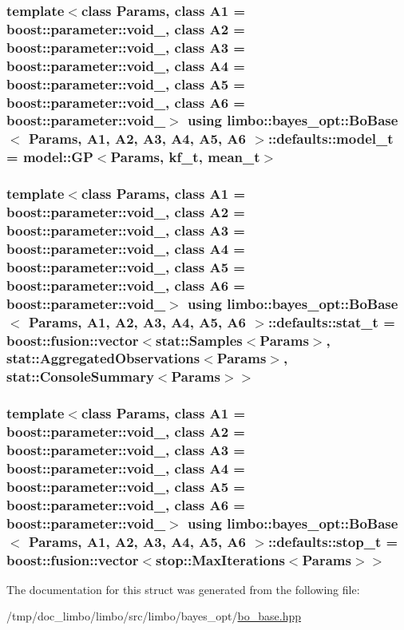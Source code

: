 \subsubsection[{model\+\_\+t}]{\setlength{\rightskip}{0pt plus 5cm}template$<$class Params, class A1 = boost\+::parameter\+::void\+\_\+, class A2 = boost\+::parameter\+::void\+\_\+, class A3 = boost\+::parameter\+::void\+\_\+, class A4 = boost\+::parameter\+::void\+\_\+, class A5 = boost\+::parameter\+::void\+\_\+, class A6 = boost\+::parameter\+::void\+\_\+$>$ using {\bf limbo\+::bayes\+\_\+opt\+::\+Bo\+Base}$<$ Params, A1, A2, A3, A4, A5, A6 $>$\+::{\bf defaults\+::model\+\_\+t} =  {\bf model\+::\+G\+P}$<$Params, {\bf kf\+\_\+t}, {\bf mean\+\_\+t}$>$}\label{structlimbo_1_1bayes__opt_1_1_bo_base_1_1defaults_aa9a30c408b869fd46861b028b6325b4a}
\hypertarget{structlimbo_1_1bayes__opt_1_1_bo_base_1_1defaults_a3c475362a937e011e02c715e8edbf2d1}{}
\subsubsection[{stat\+\_\+t}]{\setlength{\rightskip}{0pt plus 5cm}template$<$class Params, class A1 = boost\+::parameter\+::void\+\_\+, class A2 = boost\+::parameter\+::void\+\_\+, class A3 = boost\+::parameter\+::void\+\_\+, class A4 = boost\+::parameter\+::void\+\_\+, class A5 = boost\+::parameter\+::void\+\_\+, class A6 = boost\+::parameter\+::void\+\_\+$>$ using {\bf limbo\+::bayes\+\_\+opt\+::\+Bo\+Base}$<$ Params, A1, A2, A3, A4, A5, A6 $>$\+::{\bf defaults\+::stat\+\_\+t} =  boost\+::fusion\+::vector$<${\bf stat\+::\+Samples}$<$Params$>$, {\bf stat\+::\+Aggregated\+Observations}$<$Params$>$, {\bf stat\+::\+Console\+Summary}$<$Params$>$$>$}\label{structlimbo_1_1bayes__opt_1_1_bo_base_1_1defaults_a3c475362a937e011e02c715e8edbf2d1}
\hypertarget{structlimbo_1_1bayes__opt_1_1_bo_base_1_1defaults_aabb9a88029b7b3cba6d1bafe3dfadaf5}{}
\subsubsection[{stop\+\_\+t}]{\setlength{\rightskip}{0pt plus 5cm}template$<$class Params, class A1 = boost\+::parameter\+::void\+\_\+, class A2 = boost\+::parameter\+::void\+\_\+, class A3 = boost\+::parameter\+::void\+\_\+, class A4 = boost\+::parameter\+::void\+\_\+, class A5 = boost\+::parameter\+::void\+\_\+, class A6 = boost\+::parameter\+::void\+\_\+$>$ using {\bf limbo\+::bayes\+\_\+opt\+::\+Bo\+Base}$<$ Params, A1, A2, A3, A4, A5, A6 $>$\+::{\bf defaults\+::stop\+\_\+t} =  boost\+::fusion\+::vector$<${\bf stop\+::\+Max\+Iterations}$<$Params$>$$>$}\label{structlimbo_1_1bayes__opt_1_1_bo_base_1_1defaults_aabb9a88029b7b3cba6d1bafe3dfadaf5}


The documentation for this struct was generated from the following file\+:\begin{DoxyCompactItemize}
\item 
/tmp/doc\+\_\+limbo/limbo/src/limbo/bayes\+\_\+opt/\hyperlink{bo__base_8hpp}{bo\+\_\+base.\+hpp}\end{DoxyCompactItemize}
